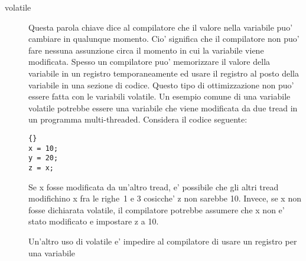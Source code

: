 \begin{description}
\item[volatile] 
Questa parola chiave dice al compilatore che il valore nella 
variabile puo' cambiare in qualunque momento. Cio' significa che
il compilatore non puo' fare nessuna assunzione circa il momento in
cui la variabile viene modificata. Spesso un compilatore puo' memorizzare
il valore della variabile in un registro temporaneamente ed usare il registro
al posto della variabile in una sezione di codice. Questo tipo di 
ottimizzazione non puo' essere fatta con le variabili {\code volatile}.
Un esempio comune di una variabile volatile potrebbe essere una
variabile che viene modificata da due tread in un programma multi-threaded.
Considera il codice seguente:
\begin{lstlisting}{}
x = 10;
y = 20;
z = x;
\end{lstlisting}
Se {\code x} fosse modificata da un'altro tread, e' possibile che gli
altri tread modifichino {\code x} fra le righe~1 e 3 cosicche' {\code z}
non sarebbe 10. Invece, se {\code x} non fosse dichiarata volatile, il
compilatore potrebbe assumere che {\code x} non e' stato modificato e
impostare {\code z} a 10.

Un'altro uso di {\code volatile} e' impedire al compilatore di usare
un registro per una variabile

\end{description}
